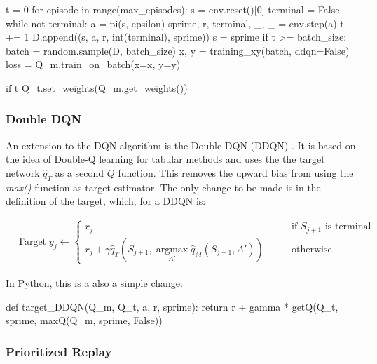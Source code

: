 \begin{withcode}
\begin{pythoncode}
t = 0
for episode in range(max_episodes):
    s = env.reset()[0]
    terminal = False
    while not terminal:
        a = pi(s, epsilon)
        sprime, r, terminal, _, _ = env.step(a)
        t += 1
        D.append((s, a, r, int(terminal), sprime))
        s = sprime
        if t >= batch_size:
            batch = random.sample(D, batch_size)
            x, y = training_xy(batch, ddqn=False)
            loss = Q_m.train_on_batch(x=x, y=y)

        if t %
            Q_t.set_weights(Q_m.get_weights())
\end{pythoncode}
\end{withcode}

\subsubsection*{Double DQN}

An extension to the DQN algorithm is the Double DQN (DDQN) . It is based on the idea of Double-Q learning for tabular methods and uses the the target network $\hat{q}_T$ as a second $Q$ function. This removes the upward bias from using the \emph{max()} function as target estimator. The only change to be made is in the definition of the target, which, for a DDQN is: 

\begin{align*}
& \text{Target}\;y_j \leftarrow \begin{cases} r_j & \qquad \text{if $S_{j+1}$ is terminal} \\
r_j + \gamma \hat{q}_T (S_{j+1}, \operatorname*{argmax}_{A'} \hat{q}_M (S_{j+1}, A') ) & \qquad \text{otherwise}\end{cases} \hspace{1in}
\end{align*}

\begin{withcode}
In Python, this is a also a simple change:

\begin{pythoncode}
def target_DDQN(Q_m, Q_t, a, r, sprime):
    return r + gamma * getQ(Q_t, sprime, maxQ(Q_m, sprime, False))
\end{pythoncode}
\end{withcode}

\subsubsection*{Prioritized Replay}

